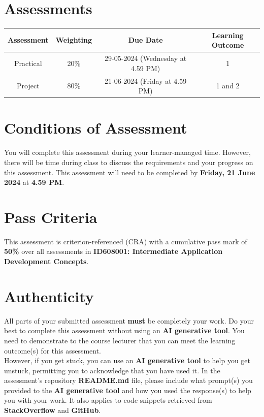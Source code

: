 \documentclass{article}
\begin{document}
\section*{Assessments}
\renewcommand{\arraystretch}{1.5}
\begin{tabular}{|c|c|c|c|}
	\hline
	\textbf{Assessment}                                 & \textbf{Weighting} & \textbf{Due Date}            & \textbf{Learning Outcome} \\ \hline
	\small Practical & \small 20\%        & \small 29-05-2024 (Wednesday at 4.59 PM)   & \small 1                   \\ \hline
	\small Project                 & \small 80\%        & \small 21-06-2024 (Friday at 4.59 PM) \small  & \small 1 and 2                   \\ \hline
\end{tabular}

\section*{Conditions of Assessment}
You will complete this assessment during your learner-managed time. However, there will be time during class to discuss the requirements and your progress on this assessment. This assessment will need to be completed by \textbf{Friday, 21 June 2024} at \textbf{4.59 PM}. 

\section*{Pass Criteria}
This assessment is criterion-referenced (CRA) with a cumulative pass mark of \textbf{50\%} over all assessments in \textbf{ID608001: Intermediate Application Development Concepts}.

\section*{Authenticity}
All parts of your submitted assessment \textbf{must} be completely your work. Do your best to complete this assessment without using an \textbf{AI generative tool}. You need to demonstrate to the course lecturer that you can meet the learning outcome(s) for this assessment. \\
 
 However, if you get stuck, you can use an \textbf{AI generative tool} to help you get unstuck, permitting you to acknowledge that you have used it. In the assessment's repository \textbf{README.md} file, please include what prompt(s) you provided to the \textbf{AI generative tool} and how you used the response(s) to help you with your work. It also applies to code snippets retrieved from \textbf{StackOverflow} and \textbf{GitHub}. \\
 
\end{document}
